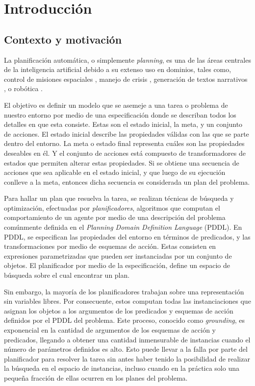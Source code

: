 \chapter{Introducción}
\label{ch:into}

\section{Contexto y motivación}
La planificación automática, o simplemente \emph{planning}, es una de las áreas
centrales de la inteligencia artificial debido a su extenso uso en dominios,
tales como, control de misiones espaciales \citep{RabideauG-et-al-2001}, manejo
de crisis \citep{Bienkowki-1995}, generación de textos narrativos
\citep{Goudoulakis-et-al-2016}, o robótica \citep{Munoz-et-al-2016}.

El objetivo es definir un modelo que se asemeje a una tarea o problema de
nuestro entorno por medio de una especificación donde se describan todos los
detalles en que esta consiste. Estas son el estado inicial, la meta, y un
conjunto de acciones. El estado inicial describe las propiedades válidas con las
que se parte dentro del entorno. La meta o estado final representa cuáles son
las propiedades deseables en él. Y el conjunto de acciones está compuesto de
transformadores de estados que permiten alterar estas propiedades. Si se obtiene
una secuencia de acciones que sea aplicable en el estado inicial, y que luego de
su ejecución conlleve a la meta, entonces dicha secuencia es considerada un plan
del problema. \citep{Georgievski-et-al-2016}

Para hallar un plan que resuelva la tarea, se realizan técnicas de búsqueda y
optimización, efectuadas por \emph{planificadores}, algoritmos que computan el
comportamiento de un agente por medio de una descripción del problema comúnmente
definida en el \emph{Planning Domain Definition Language} (PDDL). En PDDL, se
especifican las propiedades del entorno en términos de predicados, y las
transformaciones por medio de esquemas de acción. Estas consisten en expresiones
parametrizadas que pueden ser instanciadas por un conjunto de objetos. El
planificador por medio de la especificación, define un espacio de búsqueda sobre
el cual encontrar un plan.
\citep{Georgievski-et-al-2016}

Sin embargo, la mayoría de los planificadores trabajan sobre una representación
sin variables libres. Por consecuente, estos computan todas las instanciaciones
que asignan los objetos a los argumentos de los predicados y esquemas de acción
definidos por el PDDL del problema. Este proceso, conocido como
\emph{grounding}, es exponencial en la cantidad de argumentos de los esquemas de
acción y predicados, llegando a obtener una cantidad inmensurable de instancias
cuando el número de parámetros definidos es alto. Esto puede llevar a la falla
por parte del planificador para resolver la tarea sin antes haber tenido la
posibilidad de realizar la búsqueda en el espacio de instancias, incluso cuando
en la práctica solo una pequeña fracción de ellas ocurren en los planes del
problema.
\citep{Gnad_Torralba_Dominguez_Areces_Bustos_2019}

